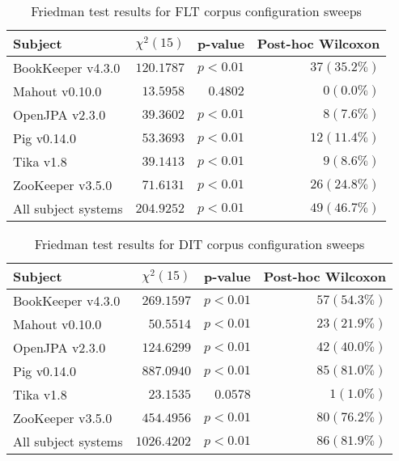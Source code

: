 \begin{table}
\begin{spacing}{1.2}
\centering
\caption{Friedman test results for FLT corpus configuration sweeps}
\label{table:combo-friedman-flt}
\begin{tabular}{lrrr}
\toprule
                      Subject & $\chi^2(15)$ &  p-value & Post-hoc Wilcoxon \\
\midrule
            BookKeeper v4.3.0 &   $120.1787$ & $p<0.01$ &     $37 (35.2\%)$ \\
               Mahout v0.10.0 &    $13.5958$ & $0.4802$ &       $0 (0.0\%)$ \\
               OpenJPA v2.3.0 &    $39.3602$ & $p<0.01$ &       $8 (7.6\%)$ \\
                  Pig v0.14.0 &    $53.3693$ & $p<0.01$ &     $12 (11.4\%)$ \\
                    Tika v1.8 &    $39.1413$ & $p<0.01$ &       $9 (8.6\%)$ \\
             ZooKeeper v3.5.0 &    $71.6131$ & $p<0.01$ &     $26 (24.8\%)$ \\
 \midrule
All subject systems &   $204.9252$ & $p<0.01$ &     $49 (46.7\%)$ \\
\bottomrule
\end{tabular}

\end{spacing}
\end{table}

\begin{table}
\begin{spacing}{1.2}
\centering
\caption{Friedman test results for DIT corpus configuration sweeps}
\label{table:combo-friedman-dit}
\begin{tabular}{lrrr}
\toprule
                      Subject & $\chi^2(15)$ &  p-value & Post-hoc Wilcoxon \\
\midrule
            BookKeeper v4.3.0 &   $269.1597$ & $p<0.01$ &     $57 (54.3\%)$ \\
               Mahout v0.10.0 &    $50.5514$ & $p<0.01$ &     $23 (21.9\%)$ \\
               OpenJPA v2.3.0 &   $124.6299$ & $p<0.01$ &     $42 (40.0\%)$ \\
                  Pig v0.14.0 &   $887.0940$ & $p<0.01$ &     $85 (81.0\%)$ \\
                    Tika v1.8 &    $23.1535$ & $0.0578$ &       $1 (1.0\%)$ \\
             ZooKeeper v3.5.0 &   $454.4956$ & $p<0.01$ &     $80 (76.2\%)$ \\
 \midrule
All subject systems &  $1026.4202$ & $p<0.01$ &     $86 (81.9\%)$ \\
\bottomrule
\end{tabular}

\end{spacing}
\end{table}

